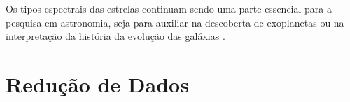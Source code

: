 Os tipos espectrais das estrelas continuam sendo uma parte essencial para a pesquisa em astronomia, seja para auxiliar na descoberta de exoplanetas ou na interpretação da história da evolução das galáxias \citep{Charbonneau_2002}. 



\section{Redução de Dados}

